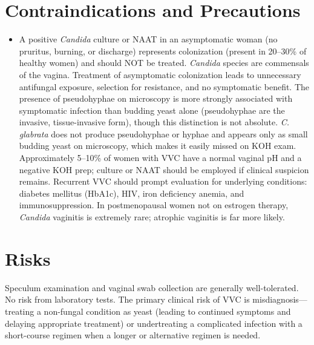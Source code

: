 \section*{Contraindications and Precautions}
\begin{itemize}
  \item A positive \textit{Candida} culture or NAAT in an asymptomatic woman (no pruritus, burning, or discharge) represents colonization (present in 20--30\% of healthy women) and should NOT be treated. \textit{Candida} species are commensals of the vagina. Treatment of asymptomatic colonization leads to unnecessary antifungal exposure, selection for resistance, and no symptomatic benefit. The presence of pseudohyphae on microscopy is more strongly associated with symptomatic infection than budding yeast alone (pseudohyphae are the invasive, tissue-invasive form), though this distinction is not absolute. \textit{C. glabrata} does not produce pseudohyphae or hyphae and appears only as small budding yeast on microscopy, which makes it easily missed on KOH exam. Approximately 5--10\% of women with VVC have a normal vaginal pH and a negative KOH prep; culture or NAAT should be employed if clinical suspicion remains. Recurrent VVC should prompt evaluation for underlying conditions: diabetes mellitus (HbA1c), HIV, iron deficiency anemia, and immunosuppression. In postmenopausal women not on estrogen therapy, \textit{Candida} vaginitis is extremely rare; atrophic vaginitis is far more likely.
\end{itemize}
\section*{Risks}
Speculum examination and vaginal swab collection are generally well-tolerated. No risk from laboratory tests. The primary clinical risk of VVC is misdiagnosis---treating a non-fungal condition as yeast (leading to continued symptoms and delaying appropriate treatment) or undertreating a complicated infection with a short-course regimen when a longer or alternative regimen is needed.

